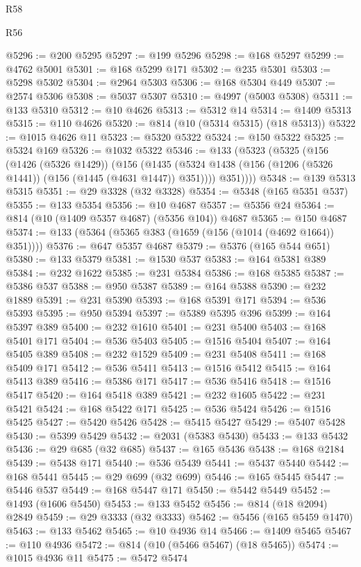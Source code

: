 \begin{lexlean}{R58}
\begin{lexlean}{R56}
\begin{coremodule}
{{{{{{{{{{{{{{{{{{{{{{{{{{{{{{{{{{{{{{{{{{{{{{{{{{{{{{{{{{{{{{{{{{{{{{{{{{{{{{{{{{{{{{{{{{{{{{{{{{{{{{{{{{{{{{{{{{{{{{{{{{{{{{{{{{{{{{{{{{{{{{{{{{{{{{{{{{{{{{{{{{{{{{{{{{{{{{{{{{{{{{{{{{{{{{{{{{{{{{{{{{{{{{{{{{{@5296 := @200 @5295
@5297 := @199 @5296
@5298 := @168 @5297
@5299 := @4762 @5001
@5301 := @168 @5299 @171
@5302 := @235 @5301
@5303 := @5298 @5302
@5304 := @2964 @5303
@5306 := @168 @5304 @449
@5307 := @2574 @5306
@5308 := @5037 @5307
@5310 := @4997 (@5003 @5308)
@5311 := @133 @5310
@5312 := @10 @4626
@5313 := @5312 @14
@5314 := @1409 @5313
@5315 := @110 @4626
@5320 := @814 (@10 (@5314 @5315) (@18 @5313))
@5322 := @1015 @4626 @11
@5323 := @5320 @5322
@5324 := @150 @5322
@5325 := @5324 @169
@5326 := @1032 @5322
@5346 := @133
    (@5323
      (@5325
        (@156
          (@1426 (@5326 @1429))
          (@156
            (@1435 (@5324 @1438 (@156 (@1206 (@5326 @1441)) (@156 (@1445 (@4631 @1447)) @351))))
            @351))))
@5348 := @139 @5313 @5315
@5351 := @29 @3328 (@32 @3328)
@5354 := @5348 (@165 @5351 @537)
@5355 := @133 @5354
@5356 := @10 @4687
@5357 := @5356 @24
@5364 := @814 (@10 (@1409 @5357 @4687) (@5356 @104)) @4687
@5365 := @150 @4687
@5374 := @133 (@5364 (@5365 @383 (@1659 (@156 (@1014 (@4692 @1664)) @351))))
@5376 := @647 @5357 @4687
@5379 := @5376 (@165 @544 @651)
@5380 := @133 @5379
@5381 := @1530 @537
@5383 := @164 @5381 @389
@5384 := @232 @1622
@5385 := @231 @5384
@5386 := @168 @5385
@5387 := @5386 @537
@5388 := @950 @5387
@5389 := @164 @5388
@5390 := @232 @1889
@5391 := @231 @5390
@5393 := @168 @5391 @171
@5394 := @536 @5393
@5395 := @950 @5394
@5397 := @5389 @5395 @396
@5399 := @164 @5397 @389
@5400 := @232 @1610
@5401 := @231 @5400
@5403 := @168 @5401 @171
@5404 := @536 @5403
@5405 := @1516 @5404
@5407 := @164 @5405 @389
@5408 := @232 @1529
@5409 := @231 @5408
@5411 := @168 @5409 @171
@5412 := @536 @5411
@5413 := @1516 @5412
@5415 := @164 @5413 @389
@5416 := @5386 @171
@5417 := @536 @5416
@5418 := @1516 @5417
@5420 := @164 @5418 @389
@5421 := @232 @1605
@5422 := @231 @5421
@5424 := @168 @5422 @171
@5425 := @536 @5424
@5426 := @1516 @5425
@5427 := @5420 @5426
@5428 := @5415 @5427
@5429 := @5407 @5428
@5430 := @5399 @5429
@5432 := @2031 (@5383 @5430)
@5433 := @133 @5432
@5436 := @29 @685 (@32 @685)
@5437 := @165 @5436
@5438 := @168 @2184
@5439 := @5438 @171
@5440 := @536 @5439
@5441 := @5437 @5440
@5442 := @168 @5441
@5445 := @29 @699 (@32 @699)
@5446 := @165 @5445
@5447 := @5446 @537
@5449 := @168 @5447 @171
@5450 := @5442 @5449
@5452 := @1493 (@1606 @5450)
@5453 := @133 @5452
@5456 := @814 (@18 @2094) @2849
@5459 := @29 @3333 (@32 @3333)
@5462 := @5456 (@165 @5459 @1470)
@5463 := @133 @5462
@5465 := @10 @4936 @14
@5466 := @1409 @5465
@5467 := @110 @4936
@5472 := @814 (@10 (@5466 @5467) (@18 @5465))
@5474 := @1015 @4936 @11
@5475 := @5472 @5474
}}}}}}}}}}}}}}}}}}}}}}}}}}}}}}}}}}}}}}}}}}}}}}}}}}}}}}}}}}}}}}}}}}}}}}}}}}}}}}}}}}}}}}}}}}}}}}}}}}}}}}}}}}}}}}}}}}}}}}}}}}}}}}}}}}}}}}}}}}}}}}}}}}}}}}}}}}}}}}}}}}}}}}}}}}}}}}}}}}}}}}}}}}}}}}}}}}}}}}}}}}}}}}}}}}}
\end{coremodule}
\end{lexlean}
\end{lexlean}
